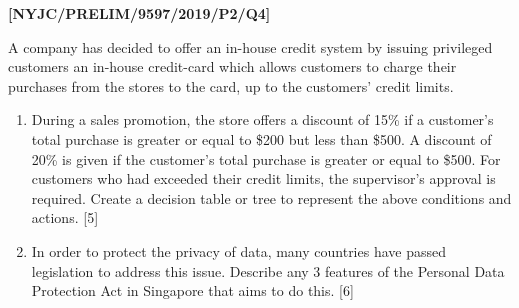 \item \textbf{{[}NYJC/PRELIM/9597/2019/P2/Q4{]} }

A company has decided to offer an in-house credit system by issuing
privileged customers an in-house credit-card which allows customers
to charge their purchases from the stores to the card, up to the customers\textquoteright{}
credit limits.
\begin{enumerate}
\item During a sales promotion, the store offers a discount of 15\% if a
customer\textquoteright s total purchase is greater or equal to \$200
but less than \$500. A discount of 20\% is given if the customer\textquoteright s
total purchase is greater or equal to \$500. For customers who had
exceeded their credit limits, the supervisor\textquoteright s approval
is required. Create a decision table or tree to represent the above
conditions and actions. \hfill{}{[}5{]}
\item In order to protect the privacy of data, many countries have passed
legislation to address this issue. Describe any 3 features of the
Personal Data Protection Act in Singapore that aims to do this. \hfill{}{[}6{]}
\end{enumerate}